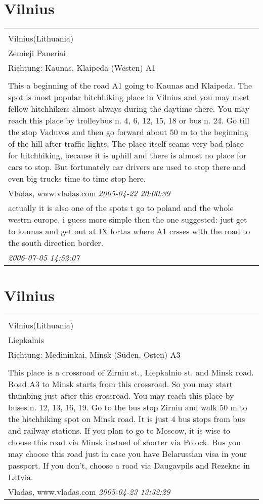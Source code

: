 \documentclass[a4paper,12pt]{article}
\begin{document}
\section{Vilnius}
\begin{tabular}{|p{13cm}|}
\hline\\
Vilnius(Lithuania)\\
Zemieji Paneriai\\
Richtung: Kaunas, Klaipeda (Westen) A1 \\
\hline\\
This a beginning of the road A1 going to Kaunas and Klaipeda. The spot is most popular hitchhiking place in Vilnius and you may meet fellow hitchhikers almost always during the daytime there.
You may reach this place by trolleybus n. 4, 6, 12, 15, 18 or bus n. 24. Go till the stop Vaduvos and then go forward about 50 m to the beginning of the hill after traffic lights.
The place itself seams very bad place for hitchhiking, because it is uphill and there is almost no place for cars to stop. But fortunately car drivers are used to stop there and even big trucks time to time stop here. \\
Vladas, www.vladas.com \textit{ 2005-04-22 20:00:39 }\\\hline actually it is also one of the spots t go to poland and the whole westrn europe, i guess more simple then the one suggested: just get to kaunas and get out at IX fortas where A1 crsses with the road to the south direction border. \\
\textit{ 2006-07-05 14:52:07 }\\\hline
\end{tabular}


\section{Vilnius}
\begin{tabular}{|p{13cm}|}
\hline\\
Vilnius(Lithuania)\\
Liepkalnis\\
Richtung: Medininkai, Minsk (Süden, Osten) A3 \\
\hline\\
This place is a crossroad of Zirniu st., Liepkalnio st. and Minsk road. Road A3 to Minsk starts from this crossroad. So you may start thumbing just after this crossroad.
You may reach this place by buses n. 12, 13, 16, 19. Go to the bus stop Zirniu and walk 50 m to the hitchhiking spot on Minsk road. It is just 4 bus stops from bus and railway stations.
If you plan to go to Moscow, it is wise to choose this road via Minsk instaed of shorter via Polock. Bus you may choose this road just in case you have Belarussian visa in your passport. If you don't, choose a road via Daugavpils and Rezekne in Latvia. \\
Vladas, www.vladas.com \textit{ 2005-04-23 13:32:29 }\\\hline
\end{tabular}
\end{document}
